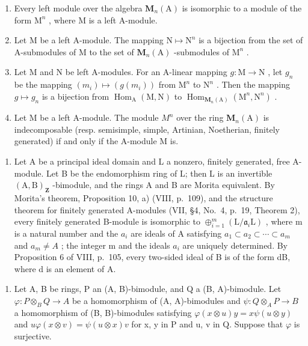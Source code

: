 \begin{enumerate}
\def\labelenumi{\alph{enumi})}
\item
  Every left module over the algebra \(\mathbf{M}_n(\mathrm{A})\) is isomorphic to a module of the form \(\mathrm{M}^n\) , where \(\mathrm{M}\) is a left A-module.
\item
  Let \(\mathrm{M}\) be a left A-module. The mapping \(\mathrm{N} \mapsto \mathrm{N}^n\) is a bijection from the set of A-submodules of \(\mathrm{M}\) to the set of \(\mathbf{M}_n(\mathrm{A})\) -submodules of \(\mathrm{M}^n\) .
\item
  Let M and N be left A-modules. For an A-linear mapping \(g: \mathrm{M} \to \mathrm{N}\) , let \(g_{n}\) be the mapping \((m_{i}) \mapsto (g(m_{i}))\) from \(\mathrm{M}^{n}\) to \(\mathrm{N}^{n}\) . Then the mapping \(g \mapsto g_{n}\) is a bijection from \(\operatorname{Hom}_{\mathrm{A}}(\mathrm{M}, \mathrm{N})\) to \(\operatorname{Hom}_{\mathbf{M}_{n}(\mathrm{A})}(\mathrm{M}^{n}, \mathrm{N}^{n})\) .
\item
  Let M be a left A-module. The module \(M^{n}\) over the ring \(\mathbf{M}_{n}(\mathrm{A})\) is indecomposable (resp. semisimple, simple, Artinian, Noetherian, finitely generated) if and only if the A-module M is.
\end{enumerate}

\begin{enumerate}
\def\labelenumi{\arabic{enumi})}
\setcounter{enumi}{2}
\tightlist
\item
  Let A be a principal ideal domain and L a nonzero, finitely generated, free A-module. Let B be the endomorphism ring of L; then L is an invertible \((\mathrm{A},\mathrm{B})_{\mathbf{Z}}\) -bimodule, and the rings A and B are Morita equivalent. By Morita's theorem, Proposition 10, a) (VIII, p.~109), and the structure theorem for finitely generated A-modules (VII, §4, No.~4, p.~19, Theorem 2), every finitely generated B-module is isomorphic to \(\oplus_{i=1}^{m}(\mathrm{L}/\mathfrak{a}_{i}\mathrm{L})\) , where m is a natural number and the \(a_{i}\) are ideals of A satisfying \(a_{1} \subset a_{2} \subset \cdots \subset a_{m}\) and \(a_{m} \neq A\) ; the integer m and the ideals \(a_{i}\) are uniquely determined. By Proposition 6 of VIII, p.~105, every two-sided ideal of B is of the form dB, where d is an element of A.
\end{enumerate}


\begin{enumerate}
\def\labelenumi{\arabic{enumi})}
\tightlist
\item
  Let A, B be rings, P an (A, B)-bimodule, and Q a (B, A)-bimodule. Let \(\varphi: P \otimes_{B} Q \to A\) be a homomorphism of (A, A)-bimodules and \(\psi: Q \otimes_{A} P \to B\) a homomorphism of (B, B)-bimodules satisfying \(\varphi(x \otimes u)y = x\psi(u \otimes y)\) and \(u\varphi(x \otimes v) = \psi(u \otimes x)v\) for x, y in P and u, v in Q. Suppose that \(\varphi\) is surjective.
\end{enumerate}

